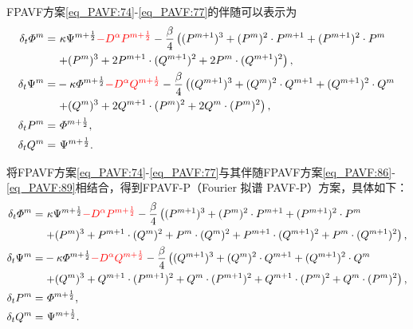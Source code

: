 FPAVF方案\eqref{eq_PAVF:74}-\eqref{eq_PAVF:77}的伴随可以表示为
\begin{align}
\delta_{t} \varPhi^{m}=&~\kappa \Psi^{m+\frac{1}{2}}\textcolor[rgb]{1.00,0.00,0.00}{-D^{\alpha} P^{m+\frac{1}{2}}}-\frac{\beta}{4}\left( (P^{m+1})^3+ (P^{m})^{2}\cdot P^{m+1}+(P^{m+1})^{2}\cdot P^{m}\right.\nonumber\\
	&\left.+ (P^{m})^{3}+2 P^{m+1}\cdot (Q^{m+1})^{2}+2 P^{m}\cdot (Q^{m+1})^{2}\right),\label{eq_PAVF:86}\\
\delta_{t} \Psi^{m}=&-\kappa \varPhi^{m+\frac{1}{2}}\textcolor[rgb]{1.00,0.00,0.00}{-D^{\alpha} Q^{m+\frac{1}{2}}}-\frac{\beta}{4}\left( (Q^{m+1})^3+ (Q^{m})^{2}\cdot Q^{m+1}+ (Q^{m+1})^{2}\cdot Q^{m}\right.\nonumber\\
	&\left.+ (Q^{m})^{3}+2 Q^{m+1}\cdot (P^{m})^{2}+2 Q^{m}\cdot (P^{m})^{2}\right),\label{eq_PAVF:87}\\
\delta_{t} P^{m}=&~\varPhi^{m+\frac{1}{2}},\label{eq_PAVF:88}\\
\delta_{t} Q^{m}=&~\Psi^{m+\frac{1}{2}}.\label{eq_PAVF:89}
\end{align}

将FPAVF方案\eqref{eq_PAVF:74}-\eqref{eq_PAVF:77}与其伴随FPAVF方案\eqref{eq_PAVF:86}-\eqref{eq_PAVF:89}相结合，得到FPAVF-P（Fourier 拟谱 PAVF-P）方案，具体如下：
\begin{align}
\delta_{t} \varPhi^{m}=&~\kappa \Psi^{m+\frac{1}{2}}\textcolor[rgb]{1.00,0.00,0.00}{-D^{\alpha} P^{m+\frac{1}{2}}}-\frac{\beta}{4}\left((P^{m+1})^3+(P^{m})^{2}\cdot P^{m+1}+(P^{m+1})^{2}\cdot P^{m}\right.\nonumber\\
	&\left.+(P^{m})^{3}+P^{m+1}\cdot (Q^{m})^{2}+P^{m}\cdot (Q^{m})^{2}+P^{m+1}\cdot (Q^{m+1})^{2}+P^{m}\cdot (Q^{m+1})^{2}\right),\label{eq_PAVF:98}\\
\delta_{t} \Psi^{m}=&-\kappa \varPhi^{m+\frac{1}{2}}\textcolor[rgb]{1.00,0.00,0.00}{-D^{\alpha} Q^{m+\frac{1}{2}}}-\frac{\beta}{4}\left((Q^{m+1})^3+(Q^{m})^{2}\cdot Q^{m+1}+(Q^{m+1})^{2}\cdot Q^{m}\right.\nonumber\\
	&\left.+(Q^{m})^{3}+Q^{m+1}\cdot (P^{m+1})^{2}+Q^{m}\cdot (P^{m+1})^{2}+Q^{m+1}\cdot (P^{m})^{2}+Q^{m}\cdot (P^{m})^{2}\right),\label{eq_PAVF:99}\\
\delta_{t} P^{m}=&~\varPhi^{m+\frac{1}{2}},\label{eq_PAVF:100}\\
\delta_{t} Q^{m}=&~\Psi^{m+\frac{1}{2}}.\label{eq_PAVF:101}
\end{align}

